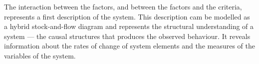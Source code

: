 The interaction between the factors, and between the factors and the
criteria, represents a first description of the system.
%
This description cam be modelled as a hybrid stock-and-flow diagram and 
represents the structural understanding of a
system --- the causal structures that produces the observed behaviour.
%
It reveals information about the rates of change of system elements
and the measures of the variables of the system.
%


